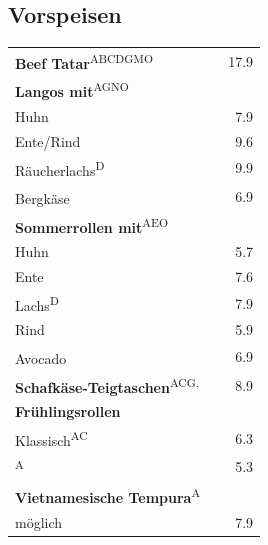 \documentclass[a4paper,12pt]{article}
\newcommand{\vegan}{\textbf{\scriptsize \color{vegan}{Vegan}}}
\newcommand{\vegetarisch}{\textbf{\scriptsize \color{vegan}{Veg}}}
\begin{document}
\begin{multicols}{2}
\section*{Vorspeisen}
\begin{tabular}{Lrr}
\textbf{Beef Tatar}\textsuperscript{{\scriptsize ABCDGMO}} & & 17.9\vspace{0.1cm}\\
\textbf{Langos mit}\textsuperscript{{\scriptsize AGNO}}\\
\hspace{0.4cm}Huhn & & 7.9\\
\hspace{0.4cm}Ente/Rind & & 9.6\\
\hspace{0.4cm}Räucherlachs\textsuperscript{{\scriptsize D}} & & 9.9\\
\hspace{0.4cm}Bergkäse\textsuperscript{\vegetarisch} & & 6.9\vspace{0.1cm}\\
\textbf{Sommerrollen mit}\textsuperscript{{\scriptsize AEO}}\\
\hspace{0.4cm}Huhn & & 5.7\\
\hspace{0.4cm}Ente & & 7.6\\
\hspace{0.4cm}Lachs\textsuperscript{{\scriptsize D}} & & 7.9\\
\hspace{0.4cm}Rind & & 5.9\\
\hspace{0.4cm}Avocado\textsuperscript{{\scriptsize \vegan}} & & 6.9\vspace{0.1cm}\\
\textbf{Schafkäse-Teigtaschen}\textsuperscript{{\scriptsize ACG, \vegetarisch}} & & 8.9\vspace{0.1cm}\\
\textbf{Frühlingsrollen}\\
\hspace{0.4cm}Klassisch\textsuperscript{{\scriptsize AC}} & & 6.3\\
\textsuperscript{{\scriptsize A}} & & 5.3\vspace{0.1cm}\\
\textbf{Vietnamesische Tempura}\textsuperscript{{\scriptsize A}}\\
\hspace{0.4cm}\scriptsize {} möglich & & 7.9
\end{tabular}



\end{multicols}
\end{document}

